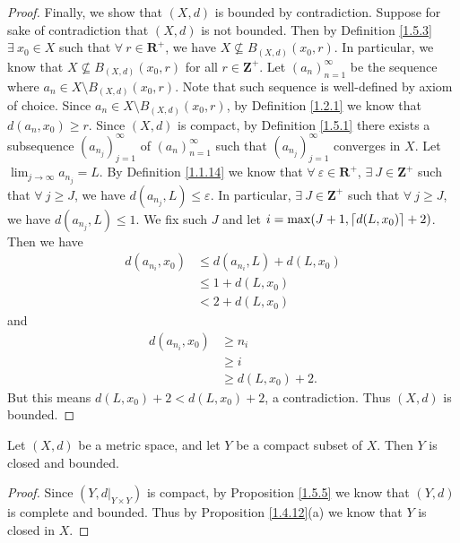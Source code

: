 \begin{proof}
    Finally, we show that \((X, d)\) is bounded by contradiction.
    Suppose for sake of contradiction that \((X, d)\) is not bounded.
    Then by Definition \ref{1.5.3} \(\exists\ x_0 \in X\) such that \(\forall\ r \in \mathbf{R}^+\), we have \(X \not\subseteq B_{(X, d)}(x_0, r)\).
    In particular, we know that \(X \not\subseteq B_{(X, d)}(x_0, r)\) for all \(r \in \mathbf{Z}^+\).
    Let \((a_n)_{n = 1}^\infty\) be the sequence where \(a_n \in X \setminus B_{(X, d)}(x_0, r)\).
    Note that such sequence is well-defined by axiom of choice.
    Since \(a_n \in X \setminus B_{(X, d)}(x_0, r)\), by Definition \ref{1.2.1} we know that \(d(a_n, x_0) \geq r\).
    Since \((X, d)\) is compact, by Definition \ref{1.5.1} there exists a subsequence \((a_{n_j})_{j = 1}^\infty\) of \((a_n)_{n = 1}^\infty\) such that \((a_{n_j})_{j = 1}^\infty\) converges in \(X\).
    Let \(\lim_{j \to \infty} a_{n_j} = L\).
    By Definition \ref{1.1.14} we know that \(\forall\ \varepsilon \in \mathbf{R}^+\), \(\exists\ J \in \mathbf{Z}^+\) such that \(\forall\ j \geq J\), we have \(d(a_{n_j}, L) \leq \varepsilon\).
    In particular, \(\exists\ J \in \mathbf{Z}^+\) such that \(\forall\ j \geq J\), we have \(d(a_{n_j}, L) \leq 1\).
    We fix such \(J\) and let \(i = \max(J + 1, \lceil d(L, x_0)\rceil + 2)\).
    Then we have
    \begin{align*}
        d(a_{n_i}, x_0) & \leq d(a_{n_i}, L) + d(L, x_0) \\
                        & \leq 1 + d(L, x_0)             \\
                        & < 2 + d(L, x_0)
    \end{align*}
    and
    \begin{align*}
        d(a_{n_i}, x_0) & \geq n_i            \\
                        & \geq i              \\
                        & \geq d(L, x_0) + 2.
    \end{align*}
    But this means \(d(L, x_0) + 2 < d(L, x_0) + 2\), a contradiction.
    Thus \((X, d)\) is bounded.
\end{proof}

\begin{corollary}\label{1.5.6}
    Let \((X, d)\) be a metric space, and let \(Y\) be a compact subset of \(X\).
    Then \(Y\) is closed and bounded.
\end{corollary}

\begin{proof}
    Since \((Y, d|_{Y \times Y})\) is compact, by Proposition \ref{1.5.5} we know that \((Y, d)\) is complete and bounded.
    Thus by Proposition \ref{1.4.12}(a) we know that \(Y\) is closed in \(X\).
\end{proof}